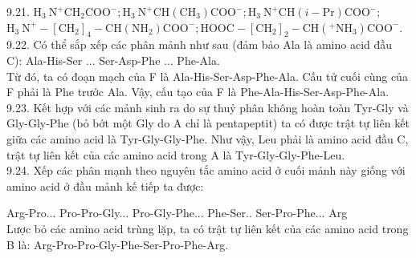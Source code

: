\documentclass[10pt]{article}
\begin{document}
9.21. $\mathrm{H}_{3} \mathrm{~N}^{+} \mathrm{CH}_{2} \mathrm{COO}^{-} ; \mathrm{H}_{3} \mathrm{~N}^{+} \mathrm{CH}\left(\mathrm{CH}_{3}\right) \mathrm{COO}^{-} ; \mathrm{H}_{3} \mathrm{~N}^{+} \mathrm{CH}(i-\mathrm{Pr}) \mathrm{COO}^{-}$; $\mathrm{H}_{3} \mathrm{~N}^{+}-\left[\mathrm{CH}_{2}\right]_{4}-\mathrm{CH}\left(\mathrm{NH}_{2}\right) \mathrm{COO}^{-} ; \mathrm{HOOC}-\left[\mathrm{CH}_{2}\right]_{2}-\mathrm{CH}\left({ }^{+} \mathrm{NH}_{3}\right) \mathrm{COO}^{-}$.\\
9.22. Có thể sắp xếp các phân mảnh như sau (đảm bảo Ala là amino acid đầu C): Ala-His-Ser ... Ser-Asp-Phe ... Phe-Ala.\\
Từ đó, ta có đoạn mạch của F là Ala-His-Ser-Asp-Phe-Ala. Cấu tử cuối cùng của F phải là Phe trước Ala. Vậy, cấu tạo của F là Phe-Ala-His-Ser-Asp-Phe-Ala.\\
9.23. Kết hợp với các mảnh sinh ra do sự thuỷ phân không hoàn toàn Tyr-Gly và Gly-Gly-Phe (bỏ bớt một Gly do A chỉ là pentapeptit) ta có được trật tự liên kết giữa các amino acid là Tyr-Gly-Gly-Phe. Như vậy, Leu phải là amino acid đầu C, trật tự liên kết của các amino acid trong A là Tyr-Gly-Gly-Phe-Leu.\\
9.24. Xếp các phân mạnh theo nguyên tắc amino acid ở cuối mảnh này giống với amino acid ở đầu mảnh kế tiếp ta được:

Arg-Pro... Pro-Pro-Gly... Pro-Gly-Phe... Phe-Ser.. Ser-Pro-Phe... Arg\\
Lược bỏ các amino acid trùng lặp, ta có trật tự liên kết của các amino acid trong B là: Arg-Pro-Pro-Gly-Phe-Ser-Pro-Phe-Arg.
\end{document}
